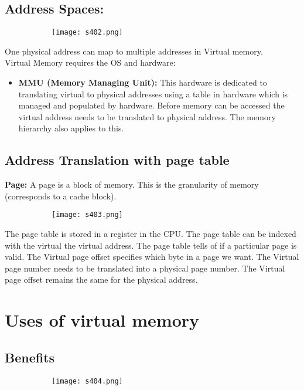 \documentclass[8pt]{extreport}
\begin{document}
\subsection{Address Spaces:}
\begin{figure}[H]
\begin{subfigure}[b]{0.4\linewidth}
\texttt{[image: s402.png]}
\end{subfigure}
\end{figure}
One physical address can map to multiple addresses in Virtual memory.\\
Virtual Memory requires the OS and hardware:
\begin{itemize}
\item \textbf{MMU (Memory Managing Unit):} This hardware is dedicated to translating virtual to physical addresses using a table in hardware which is managed and populated by hardware. Before memory can be accessed the virtual address needs to be translated to physical address. The memory hierarchy also applies to this.
\end{itemize}

\subsection{Address Translation with page  table}

\textbf{Page:} A page is a block of memory. This is the granularity of memory (corresponds to a cache block).
\begin{figure}[H]
\begin{subfigure}[b]{0.4\linewidth}
\texttt{[image: s403.png]}
\end{subfigure}
\end{figure}
The page table is stored in a register in the CPU. The page table can be indexed with the virtual the virtual address. The page table tells of if a particular page is valid. The Virtual page offset specifies which byte in a page we want. The Virtual page number needs to be translated into a physical page number. The Virtual page offset remains the same for the physical address.


\section{Uses of virtual memory}

\subsection{Benefits}
\begin{figure}[H]
\begin{subfigure}[b]{0.4\linewidth}
\texttt{[image: s404.png]}
\end{subfigure}
\end{figure}
\end{document}
